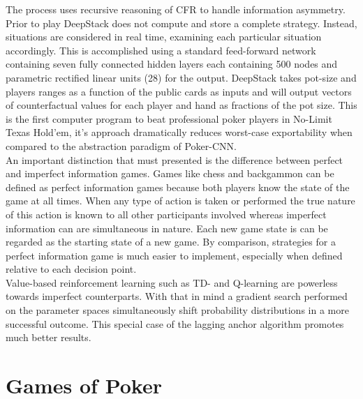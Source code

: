 \documentclass[review]{elsarticle}
\begin{document}
The process uses recursive reasoning of CFR to handle information 
asymmetry. Prior to play DeepStack does not compute and store a complete 
strategy. Instead, situations are considered in real time, examining 
each particular situation accordingly.  
This is accomplished using a standard feed-forward network 
containing seven fully connected hidden layers each containing 500 nodes 
and parametric rectified linear units (28) for the output. DeepStack 
takes pot-size and players ranges as a function of the public cards as 
inputs and will output vectors of counterfactual values for each player 
and hand as fractions of the pot size. This is the first computer program 
to beat professional poker players in No-Limit Texas 
Hold'em, it's approach dramatically reduces worst-case
exportability when compared to the abstraction paradigm of Poker-CNN. \\

An important distinction that must presented is the difference between 
perfect and imperfect information games. Games like chess and backgammon 
can be defined as perfect information games because both players know 
the state of the game at all times. When any type of action is taken 
or performed the true nature of this action is known to all other 
participants involved whereas imperfect information can are 
simultaneous in nature. Each new game state is can be regarded as 
the starting state of a new game. By comparison, strategies for a 
perfect information game is much easier to implement, especially 
when defined relative to each decision point.\\
Value-based reinforcement learning such as TD- and Q-learning are
powerless towards imperfect counterparts. With that in mind a gradient 
search performed on the parameter spaces simultaneously shift probability
distributions in a more successful outcome. This special case of the 
lagging anchor algorithm promotes much better results.
~\cite{ Dfredrik2001} \\


\section{Games of Poker}
\end{document}
